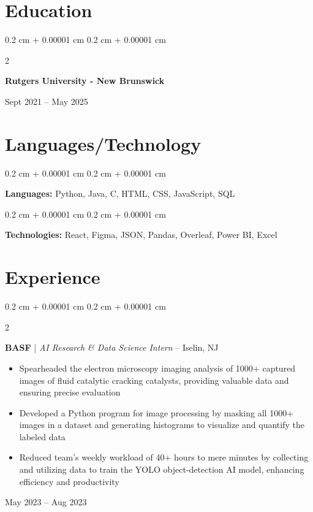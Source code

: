 \documentclass[10pt, letterpaper]{article}
\newenvironment{highlights}{
    \begin{itemize}[
        topsep=0.10 cm,
        parsep=0.10 cm,
        partopsep=0pt,
        itemsep=0pt,
        leftmargin=0.4 cm + 10pt
    ]
}{
    \end{itemize}
}
\newenvironment{onecolentry}{
    \begin{adjustwidth}{
        0.2 cm + 0.00001 cm
    }{
        0.2 cm + 0.00001 cm
    }
}{
    \end{adjustwidth}
}
\newenvironment{twocolentry}[2][]{
    \onecolentry
    \def\secondColumn{#2}
    \setcolumnwidth{\fill, 4.5 cm}
    \begin{paracol}{2}
}{
    \switchcolumn \raggedleft \secondColumn
    \end{paracol}
    \endonecolentry
}
\begin{document}
    \section{Education}

        \begin{twocolentry}{
            Sept 2021 – May 2025

            \vspace{0.1 cm}
            
            \text{GPA: 3.50}
        }
            \textbf{Rutgers University - New Brunswick}

            \vspace{0.1 cm}
            
            
        \end{twocolentry}

    \section{Languages/Technology}

        \begin{onecolentry}
            \textbf{Languages:} Python, Java, C, HTML, CSS, JavaScript, SQL
        \end{onecolentry}

        \vspace{0.1 cm}

        \begin{onecolentry}
            \textbf{Technologies:} React, Figma, JSON, Pandas, Overleaf, Power BI, Excel
        \end{onecolentry}

    \section{Experience}

        \begin{twocolentry}{
        May 2023 – Aug 2023
        }
            \textbf{BASF} | \textit{AI Research \& Data Science Intern} – Iselin, NJ
            \begin{highlights}
                \item Spearheaded the electron microscopy imaging analysis of 1000+ captured images of fluid catalytic cracking catalysts, providing valuable data and ensuring precise evaluation
                \item Developed a Python program for image processing by masking all 1000+ images in a dataset and generating histograms to visualize and quantify the labeled data
                \item Reduced team's weekly workload of 40+ hours to mere minutes by collecting and utilizing data to train the YOLO object-detection AI model, enhancing efficiency and productivity
            \end{highlights}
        \end{twocolentry}
\end{document}
